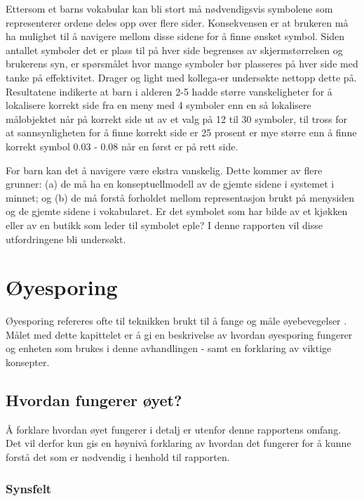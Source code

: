 \documentclass[phd,tocprelim]{cornell}
\begin{document}
Ettersom et barns vokabular kan bli stort må nødvendigsvis symbolene som representerer ordene deles opp over flere sider. Konsekvensen er at brukeren må ha mulighet til å navigere mellom disse sidene for å finne ønsket symbol. Siden antallet symboler det er plass til på hver side begrenses av skjermstørrelsen og brukerens syn, er spørsmålet hvor mange symboler bør plasseres på hver side med tanke på effektivitet. Drager og light med kollega-er undersøkte nettopp dette på. Resultatene indikerte at barn i alderen 2-5 hadde større vanskeligheter for å lokalisere korrekt side fra en meny med 4 symboler enn en så lokalisere målobjektet når på korrekt side ut av et valg på 12 til 30 symboler, til tross for at sannsynligheten for å finne korrekt side er 25 prosent er mye større enn å finne korrekt symbol 0.03 - 0.08 når en først er på rett side.

For barn kan det å navigere være ekstra vanskelig. Dette kommer av flere grunner: (a) de må ha en konseptuellmodell av de gjemte sidene i systemet i minnet; og (b) de må forstå forholdet mellom representasjon brukt på menysiden og de gjemte sidene i vokabularet. Er det symbolet som har bilde av et kjøkken eller av en butikk som leder til symbolet eple? I denne rapporten vil disse utfordringene bli undersøkt.




\chapter{Øyesporing}

Øyesporing refereres ofte til teknikken brukt til å fange og måle øyebevegelser \cite{Calibration}. Målet med dette kapittelet er å gi en beskrivelse av hvordan øyesporing fungerer og enheten som brukes i denne avhandlingen - samt en forklaring av viktige konsepter.


\section{Hvordan fungerer øyet?}

Å forklare hvordan øyet fungerer i detalj er utenfor denne rapportens omfang. Det vil derfor kun gis en høynivå forklaring av hvordan det fungerer for å kunne forstå det som er nødvendig i henhold til rapporten. 

\subsection{Synsfelt}
\end{document}
